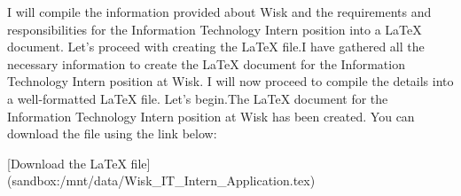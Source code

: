 I will compile the information provided about Wisk and the requirements and responsibilities for the Information Technology Intern position into a LaTeX document. Let's proceed with creating the LaTeX file.I have gathered all the necessary information to create the LaTeX document for the Information Technology Intern position at Wisk. I will now proceed to compile the details into a well-formatted LaTeX file. Let's begin.The LaTeX document for the Information Technology Intern position at Wisk has been created. You can download the file using the link below:

[Download the LaTeX file](sandbox:/mnt/data/Wisk_IT_Intern_Application.tex)